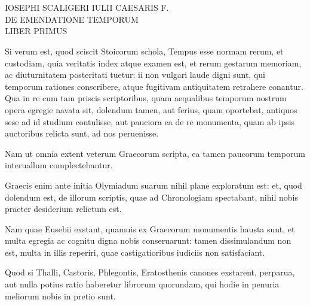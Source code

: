 

\chapter{}
\begin{center}
{\scshape
IOSEPHI SCALIGERI IULII CAESARIS F.\\
DE EMENDATIONE TEMPORUM\\
LIBER PRIMUS\\
}%
\end{center}
\normalsize

Si verum est, quod sciscit Stoicorum
schola, Tempus esse normam rerum, et
custodiam, quia veritatis index atque examen
est, et rerum gestarum memoriam, ac
diuturnitatem posteritati tuetur: ii non vulgari
laude digni sunt, qui temporum rationes
conscribere, atque fugitivam antiquitatem
retrahere conantur.
Qua in re cum
tam priscis scriptoribus, quam aequalibus
temporum nostrum opera egregie navata sit, dolendum tamen, aut
ferius, quam oportebat, antiquos sese ad id studium contulisse, aut pauciora
ea de re monumenta, quam ab ipsis auctoribus relicta sunt, ad
nos peruenisse.

Nam ut omnia extent veterum Graecorum scripta, ea
tamen paucorum temporum interuallum complectebantur.

Graecis
enim ante initia Olymiadum suarum nihil plane exploratum est: et,
quod dolendum est, de illorum scriptis, quae ad Chronologiam spectabant,
nihil nobis praeter desiderium relictum est.

Nam quae Eusebii exstant,
quamuis ex Graecorum monumentis hausta sunt, et multa egregia
ac cognitu digna nobis conseruarunt: tamen dissimulandum non est,
multa in illis reperiri, quae castigatioribus iudiciis non satisfaciant.

Quod si Thalli, Castoris, Phlegontis,
 Eratosthenis canones exstarent,
perparua, aut nulla potius ratio haberetur librorum quorundam, qui
hodie in penuria meliorum nobis in pretio sunt.

